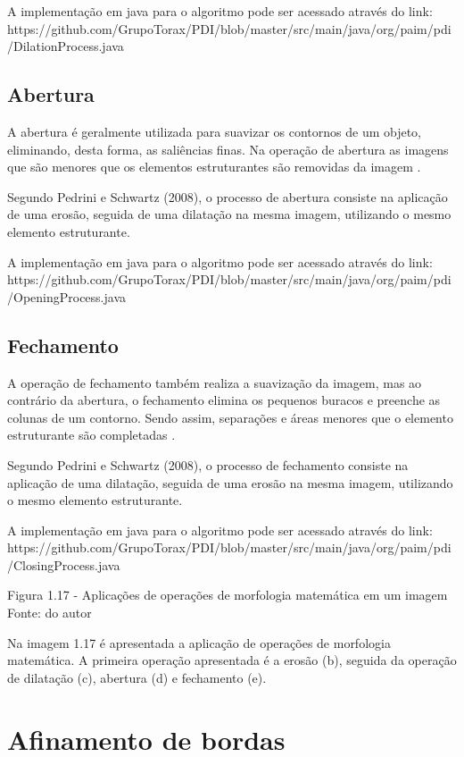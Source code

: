 \documentclass[
	12pt,				%
	oneside,			%
	a4paper,			%
	english,			%
	french,				%
	spanish,			%
	brazil,				%
	]{abntex2}
\begin{document}
A implementação em java para o algoritmo pode ser acessado através do link:
https://github.com/GrupoTorax/PDI/blob/master/src/main/java/org/paim/pdi/DilationProcess.java 

\subsection{Abertura}

A abertura é geralmente utilizada para suavizar os contornos de um objeto, eliminando, desta forma, as saliências finas. Na operação de abertura as imagens que são menores que os elementos estruturantes são removidas da imagem \cite{gonzalesWoods:2008}.

Segundo Pedrini e Schwartz (2008), o processo de abertura consiste na aplicação de uma erosão, seguida de uma dilatação na mesma imagem, utilizando o mesmo elemento estruturante.

A implementação em java para o algoritmo pode ser acessado através do link:
https://github.com/GrupoTorax/PDI/blob/master/src/main/java/org/paim/pdi/OpeningProcess.java 

\subsection{Fechamento}

A operação de fechamento também realiza a suavização da imagem, mas ao contrário da abertura, o fechamento elimina os pequenos buracos e preenche as colunas de um contorno. Sendo assim, separações e áreas menores que o elemento estruturante são completadas \cite{gonzalesWoods:2008}.

Segundo Pedrini e Schwartz (2008), o processo de fechamento consiste na aplicação de uma dilatação, seguida de uma erosão na mesma imagem, utilizando o mesmo elemento estruturante.

A implementação em java para o algoritmo pode ser acessado através do link:
https://github.com/GrupoTorax/PDI/blob/master/src/main/java/org/paim/pdi/ClosingProcess.java 

Figura 1.17 - Aplicações de operações de morfologia matemática em um imagem 
Fonte: do autor

Na imagem 1.17 é apresentada a aplicação de operações de morfologia matemática. A primeira operação apresentada é a erosão (b), seguida da operação de dilatação (c), abertura (d) e fechamento (e).
    
\section{Afinamento de bordas}    
\end{document}
